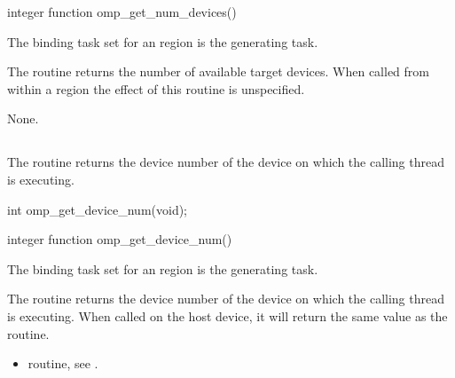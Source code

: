 \begin{fortranspecific}
\begin{ompfFunction}
integer function omp_get_num_devices()
\end{ompfFunction}
\end{fortranspecific}

\binding
The binding task set for an  region is the generating task.

\effect
The  routine returns the number of available target devices.
When called from within a  region the effect of this routine is unspecified.

\crossreferences
None.











\subsection{}
\label{subsec:omp_get_device_num}
\summary
The  routine returns the device number of the device on which
the calling thread is executing.

\format
\begin{ccppspecific}
\begin{ompcFunction}
int omp_get_device_num(void);
\end{ompcFunction}
\end{ccppspecific}


\begin{fortranspecific}
\begin{ompfFunction}
integer function omp_get_device_num()
\end{ompfFunction}
\end{fortranspecific}

\binding
The binding task set for an  region is the generating task.

\effect
The  routine returns the device number of the device on which
the calling thread is executing. When called on the host device, it will return the same
value as the  routine.

\crossreferences
\begin{itemize}
\item {} routine, see
.
\end{itemize}










